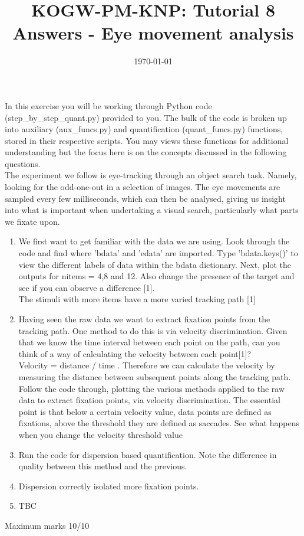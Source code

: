 \documentclass[12pt,english]{scrartcl}
\title{KOGW-PM-KNP: Tutorial 8 Answers - Eye movement analysis}
\author{}
\date{\today}
\begin{document}
\maketitle
In this exercise you will be working through Python code (step\_by\_step\_quant.py) provided to you. The bulk of the code is broken up into auxiliary (aux\_funcs.py) and quantification (quant\_funcs.py) functions, stored in their respective scripts. You may views these functions for additional understanding but the focus here is on the concepts discussed in the following questions. \\

The experiment we follow is eye-tracking through an object search task. Namely, looking for the odd-one-out in a selection of images. The eye movements are sampled every few milliseconds, which can then be analysed, giving us insight into what is important when undertaking a visual search, particularly what parts we fixate upon.


\begin{enumerate}
\item We first want to get familiar with the data we are using. Look through the code and find where 'bdata' and 'edata' are imported. Type 'bdata.keys()' to view the different labels of data within the bdata dictionary. Next, plot the outputs for nitems = 4,8 and 12. Also change the presence of the target and see if you can observe a difference [1]. \\

 \color{blue}
 The stimuli with more items have a more varied tracking path [1] 
 
 \color{black}
 \item Having seen the raw data we want to extract fixation points from the tracking path. One method to do this is via velocity discrimination. Given that we know the time interval between each point on the path, can you think of a way of calculating the velocity between each point[1]? \\
 
 \color{blue}
 Velocity = distance / time . Therefore we can calculate the velocity by measuring the distance between subsequent points along the tracking path. \\
 
 \color{black}
 Follow the code through, plotting the various methods applied to the raw data to extract fixation points, via velocity discrimination. The essential point is that below a certain velocity value, data points are defined as fixations, above the threshold they are defined as saccades. See what happens when you change the velocity threshold value \\
 
 \item Run the code for dispersion based quantification. Note the difference in quality between this method and the previous. 
 \item[]
 \color{blue}
 Dispersion correctly isolated more fixation points.
 
 \color{black}
 \item TBC
 

 \end{enumerate}

 Maximum marks 10/10 \\
\end{document}
